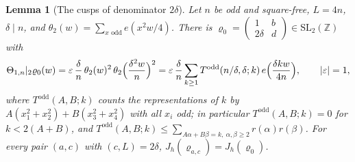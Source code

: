 ﻿\documentclass[11pt]{amsart}
\newtheorem{lemma}[theorem]{Lemma}
\theoremstyle{remark}
\newcommand{\Z}{\mathbb{Z}}
\newcommand{\e}{\varepsilon}
\begin{document}
\begin{lemma}[The cusps of denominator $2\delta$]\label{lem:oddcusp}
Let $n$ be odd and square-free, $L=4n$, $\delta\mid n$, and $\theta_2(w)=\sum_{x\text{ odd}}e(x^2w/4)$. There is $\varrho_0=\left(\begin{smallmatrix}1&b\\2\delta&d\end{smallmatrix}\right)\in\mathrm{SL}_2(\Z)$ with
\[
\Theta_{1,n}|_2\varrho_0(w)=\e\,\frac\delta n\,\theta_2(w)^2\,\theta_2\Bigl(\frac{\delta^2w}n\Bigr)^2=\e\,\frac\delta n\sum_{k\ge1}T^{\mathrm{odd}}(n/\delta,\delta;k)\,e\Bigl(\frac{\delta kw}{4n}\Bigr),\qquad|\e|=1,
\]
where $T^{\mathrm{odd}}(A,B;k)$ counts the representations of $k$ by $A(x_1^2+x_2^2)+B(x_3^2+x_4^2)$ with all $x_i$ odd; in particular $T^{\mathrm{odd}}(A,B;k)=0$ for $k<2(A+B)$, and $T^{\mathrm{odd}}(A,B;k)\le\sum_{A\alpha+B\beta=k,\ \alpha,\beta\ge2}r(\alpha)r(\beta)$. For every pair $(a,c)$ with $(c,L)=2\delta$, $J_h(\varrho_{a,c})=J_h(\varrho_0)$.
\end{lemma}
\end{document}

